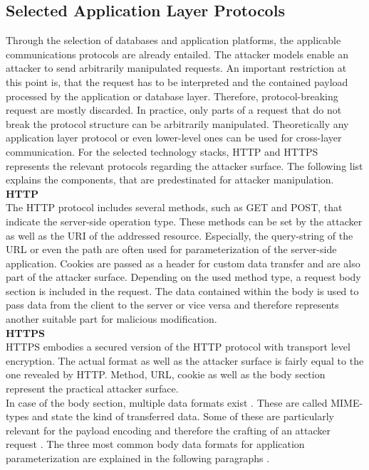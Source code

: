 \subsection{Selected Application Layer Protocols}
\label{sec:selectedAppLayerProtocols}
Through the selection of databases and application platforms, the applicable communications protocols are already entailed. The attacker models enable an attacker to send arbitrarily manipulated requests. An important restriction at this point is, that the request has to be interpreted and the contained payload processed by the application or database layer. Therefore, protocol-breaking request are mostly discarded. In practice, only  parts of a request that do not break the protocol structure can be arbitrarily manipulated. Theoretically any application layer protocol or even lower-level ones can be used for cross-layer communication. For the selected technology stacks, HTTP and HTTPS represents the relevant protocols regarding the attacker surface. The following list explains the components, that are predestinated for attacker manipulation. \\

\textbf{HTTP}\\
The HTTP protocol includes several methods, such as GET and POST, that indicate the server-side operation type. These methods can be set by the attacker as well as the URI of the addressed resource. Especially, the query-string of the URL or even the path are often used for parameterization of the server-side application. Cookies are passed as a header for custom data transfer and are also part of the attacker surface. Depending on the used method type, a request body section is included in the request. The data contained within the body is used to pass data from the client to the server or vice versa and therefore represents another suitable part for malicious modification. \\

\textbf{HTTPS}\\
HTTPS embodies a secured version of the HTTP protocol with transport level encryption. The actual format as well as the attacker surface is fairly equal to the one revealed by HTTP. Method, URL, cookie as well as the body section represent the practical attacker surface. \\

In case of the body section, multiple data formats exist \cite{Freed1996a}. These are called MIME-types and state the kind of transferred data. Some of these are particularly relevant for the payload encoding and therefore the crafting of an attacker request \cite{Zalewski:2011}. The three most common body data formats for application parameterization are explained in the following paragraphs \cite{Freed2016}.\\


